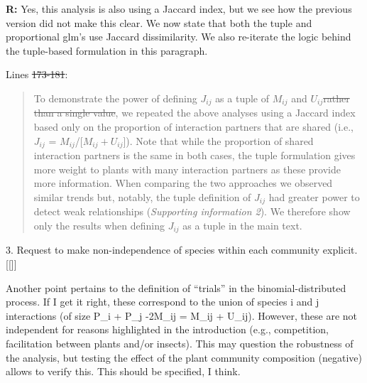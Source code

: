 \documentclass[12pt]{letter}
\newenvironment{refquote}{\bigskip \begin{it}}{\end{it}\smallskip}
\providecommand{\DIFadd}[1]{{\protect\color{blue}\uwave{#1}}} %
\providecommand{\DIFdel}[1]{{\protect\color{red}\sout{#1}}}                      %
\providecommand{\DIFaddbegin}{} %
\providecommand{\DIFaddend}{} %
\providecommand{\DIFdelbegin}{} %
\providecommand{\DIFdelend}{} %
\newcommand{\DIFscaledelfig}{0.5}
\newlength{\DIFdelgraphicswidth} %
\newlength{\DIFdelgraphicsheight} %
\newcommand{\DIFaddincludegraphics}[2][]{{\color{blue}\fbox{\DIFOincludegraphics[#1]{#2}}}} %
\newcommand{\DIFdelincludegraphics}[2][]{%
\sbox{\DIFdelgraphicsbox}{\DIFOincludegraphics[#1]{#2}}%
\settoboxwidth{\DIFdelgraphicswidth}{\DIFdelgraphicsbox} %
\settoboxtotalheight{\DIFdelgraphicsheight}{\DIFdelgraphicsbox} %
\scalebox{\DIFscaledelfig}{%
\parbox[b]{\DIFdelgraphicswidth}{\usebox{\DIFdelgraphicsbox}\\[-\baselineskip] \rule{\DIFdelgraphicswidth}{0em}}\llap{\resizebox{\DIFdelgraphicswidth}{\DIFdelgraphicsheight}{%
\setlength{\unitlength}{\DIFdelgraphicswidth}%
\begin{picture}(1,1)%
\thicklines\linethickness{2pt} %
{\color[rgb]{1,0,0}\put(0,0){\framebox(1,1){}}}%
{\color[rgb]{1,0,0}\put(0,0){\line( 1,1){1}}}%
{\color[rgb]{1,0,0}\put(0,1){\line(1,-1){1}}}%
\end{picture}%
}\hspace*{3pt}}} %
} %
\DeclareRobustCommand{\DIFaddbegin}{\DIFOaddbegin \let\includegraphics\DIFaddincludegraphics} %
\DeclareRobustCommand{\DIFaddend}{\DIFOaddend \let\includegraphics\DIFOincludegraphics} %
\DeclareRobustCommand{\DIFdelbegin}{\DIFOdelbegin \let\includegraphics\DIFdelincludegraphics} %
\DeclareRobustCommand{\DIFdelend}{\DIFOaddend \let\includegraphics\DIFOincludegraphics} %
\begin{document}
	\textbf{R:} Yes, this analysis is also using a Jaccard index, but we see how the previous version did not make this clear. We now state that both the tuple and proportional glm's use Jaccard dissimilarity. We also re-iterate the logic behind the tuple-based formulation in this paragraph.


		Lines \DIFdelbegin \DIFdel{173-181}\DIFdelend \DIFaddbegin \DIFadd{XX-XX}\DIFaddend :


		\begin{quotation}

			To demonstrate the power of defining \DIFdelbegin \DIFdel{$J_{ij}$ }\DIFdelend \DIFaddbegin \DIFadd{$\omega_{ij}$ }\DIFaddend as a tuple of $M_{ij}$ and $U_{ij}$\DIFdelbegin \DIFdel{rather than a single value}\DIFdelend , we repeated the above analyses using a Jaccard index based only on the proportion of interaction partners that are shared (i.e., \DIFdelbegin \DIFdel{$J_{ij}$ }\DIFdelend \DIFaddbegin \DIFadd{$\omega_{ij}$ }\DIFaddend = $M_{ij}$/[$M_{ij}+U_{ij}$]). Note that while the proportion of shared interaction partners is the same in both cases, the tuple formulation gives more weight to plants with many interaction partners as these provide more information. When comparing the two approaches 
		    we observed similar trends but, notably, the tuple definition of \DIFdelbegin \DIFdel{$J_{ij}$ }\DIFdelend \DIFaddbegin \DIFadd{$\omega_{ij}$ }\DIFaddend had greater power to detect weak relationships (\emph{Supporting information 2}). We therefore show only the results when defining \DIFdelbegin \DIFdel{$J_{ij}$ }\DIFdelend \DIFaddbegin \DIFadd{$\omega_{ij}$ }\DIFaddend as a tuple in the main text.

		\end{quotation}


3. Request to make non-independence of species within each community explicit. \DIFaddbegin [[\DIFadd{done}]]
\DIFaddend 

	\begin{refquote}
		Another point pertains to the definition of “trials” in the binomial-distributed process. If I get it right, these correspond to the union of species i and j interactions (of size P\_i + P\_j -2M\_ij = M\_ij + U\_ij). However, these are not independent for reasons highlighted in the introduction (e.g., competition, facilitation between plants and/or insects). This may question the robustness of the analysis, but testing the effect of the plant community composition (negative) allows to verify this. This should be specified, I think.
	\end{refquote}
\end{document}
